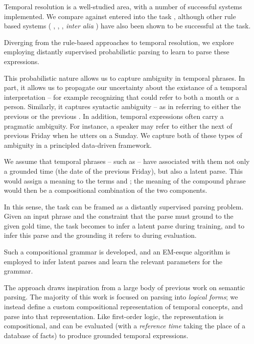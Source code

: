 
Temporal resolution is a well-studied area, with a number of successful systems
	implemented.
We compare against  \cite{key:2010strotgen-temporal}
	entered into the  task \cite{key:2010verhagen-tempeval},
	although other rule based systems (
		, 	,
		, \textit{inter alia}
	) have also been shown to be successful at the task.

Diverging from the rule-based approaches to temporal resolution,
	we explore employing distantly supervised probabilistic parsing
	to learn to parse these expressions.

This probabilistic nature allows us to capture ambiguity in temporal phrases.
In part, it allows us to propagate our uncertainty about the existance of
	a temporal interpretation -- for example recognizing that  could
	refer to both a month or a person.
Similarly, it captures syntactic ambiguity -- as in  referring to either the previous  or the previous
	.
In addition, temporal expressions often carry a pragmatic ambiguity.
For instance, a speaker may refer to either the next of previous Friday
	when he utters  on a Sunday.
We capture both of these types of ambiguity in a principled data-driven
	framework.


We assume that temporal phrases -- such as  -- have
	associated with them not only a grounded time (the date of the previous
	Friday), but also a latent parse.
This would assign a meaning to the terms  and ; the
	meaning of the compound phrase would then be a compositional combination
	of the two components.

In this sense, the task can be framed as a distantly supervised parsing
	problem.
Given an input phrase and the constraint that the parse must ground to the
	given gold time, the task becomes to infer a latent parse during
	training, and to infer this parse and the grounding it refers to during
	evaluation.

Such a compositional grammar is developed, and an EM-esque algorithm is
	employed to infer latent parses and learn the relevant parameters for
	the grammar.

The approach draws inspiration from a large body of previous work
	on semantic parsing.
The majority of this work is focused on parsing into \textit{logical forms};
	we instead define a custom compositional representation of temporal
	concepts, and parse into that representation.
Like first-order logic, the representation is compositional, and can be
	evaluated (with a \textit{reference time} taking the place of a database 
	of facts) to produce grounded temporal expressions.

